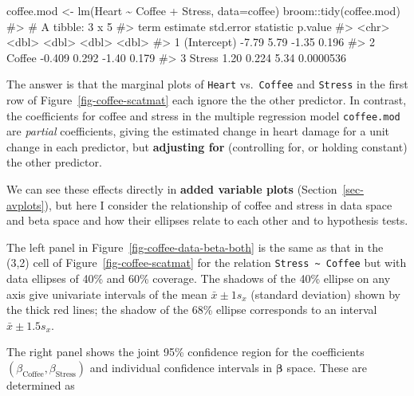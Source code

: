 \documentclass[
  letterpaper,
  10pt,
  krantz2]{krantz}
\makeatletter
\newenvironment{Shaded}{\begin{snugshade}}{\end{snugshade}}
\newcommand{\AttributeTok}[1]{\textcolor[rgb]{0.40,0.45,0.13}{#1}}
\newcommand{\CommentTok}[1]{\textcolor[rgb]{0.37,0.37,0.37}{#1}}
\newcommand{\FunctionTok}[1]{\textcolor[rgb]{0.28,0.35,0.67}{#1}}
\newcommand{\NormalTok}[1]{\textcolor[rgb]{0.00,0.23,0.31}{#1}}
\newcommand{\OtherTok}[1]{\textcolor[rgb]{0.00,0.23,0.31}{#1}}
\newcommand{\SpecialCharTok}[1]{\textcolor[rgb]{0.37,0.37,0.37}{#1}}
\newenvironment{kframe}{%
  \medskip{}
  \setlength{\fboxsep}{.8em}
  \def\at@end@of@kframe{}%
  \ifinner\ifhmode%
  \def\at@end@of@kframe{\end{minipage}}%
  \begin{minipage}{\columnwidth}%
  \fi\fi%
  \def\FrameCommand##1{\hskip\@totalleftmargin \hskip-\fboxsep
  \colorbox{shadecolor}{##1}\hskip-\fboxsep
      \hskip-\linewidth \hskip-\@totalleftmargin \hskip\columnwidth}%
  \MakeFramed {\advance\hsize-\width
    \@totalleftmargin\z@ \linewidth\hsize
    \@setminipage}}%
{\par\unskip\endMakeFramed%
  \at@end@of@kframe}
\renewenvironment{Shaded}{\begin{kframe}}{\end{kframe}}
\makeatother
\begin{document}
\begin{Shaded}
\begin{Highlighting}[]
\NormalTok{coffee.mod }\OtherTok{\textless{}{-}} \FunctionTok{lm}\NormalTok{(Heart }\SpecialCharTok{\textasciitilde{}}\NormalTok{ Coffee }\SpecialCharTok{+}\NormalTok{ Stress, }\AttributeTok{data=}\NormalTok{coffee)}
\NormalTok{broom}\SpecialCharTok{::}\FunctionTok{tidy}\NormalTok{(coffee.mod)}
\CommentTok{\#\textgreater{} \# A tibble: 3 x 5}
\CommentTok{\#\textgreater{}   term        estimate std.error statistic   p.value}
\CommentTok{\#\textgreater{}   \textless{}chr\textgreater{}          \textless{}dbl\textgreater{}     \textless{}dbl\textgreater{}     \textless{}dbl\textgreater{}     \textless{}dbl\textgreater{}}
\CommentTok{\#\textgreater{} 1 (Intercept)   {-}7.79      5.79      {-}1.35 0.196    }
\CommentTok{\#\textgreater{} 2 Coffee        {-}0.409     0.292     {-}1.40 0.179    }
\CommentTok{\#\textgreater{} 3 Stress         1.20      0.224      5.34 0.0000536}
\end{Highlighting}
\end{Shaded}

The answer is that the marginal plots of \texttt{Heart}
vs.~\texttt{Coffee} and \texttt{Stress} in the first row of
Figure~\ref{fig-coffee-scatmat} each ignore the the other predictor. In
contrast, the coefficients for coffee and stress in the multiple
regression model \texttt{coffee.mod} are \emph{partial} coefficients,
giving the estimated change in heart damage for a unit change in each
predictor, but \textbf{adjusting for} (controlling for, or holding
constant) the other predictor.

We can see these effects directly in \textbf{added variable plots}
(Section~\ref{sec-avplots}), but here I consider the relationship of
coffee and stress in data space and beta space and how their ellipses
relate to each other and to hypothesis tests.

The left panel in Figure~\ref{fig-coffee-data-beta-both} is the same as
that in the (3,2) cell of Figure~\ref{fig-coffee-scatmat} for the
relation \texttt{Stress\ \textasciitilde{}\ Coffee} but with data
ellipses of 40\% and 60\% coverage. The shadows of the 40\% ellipse on
any axis give univariate intervals of the mean \(\bar{x} \pm 1 s_x\)
(standard deviation) shown by the thick red lines; the shadow of the
68\% ellipse corresponds to an interval \(\bar{x} \pm 1.5 s_x\).

The right panel shows the joint 95\% confidence region for the
coefficients \((\beta_{\text{Coffee}}, \beta_{\text{Stress}})\) and
individual confidence intervals in \(\mathbf{\beta}\) space. These are
determined as
\end{document}
